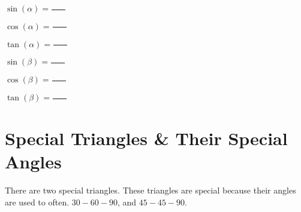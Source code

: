 \documentclass[12pt]{article}
\begin{document}
\vspace{1cm}

\begin{multicols}{2}

	$\sin(\alpha) = \frac{\hspace{1cm}}{ }$\\

		\vspace{.6cm}
	
	$\cos(\alpha) = \frac{\hspace{1cm}}{ }$\\

		\vspace{.6cm}
	
	$\tan(\alpha) = \frac{\hspace{1cm}}{ }$\\
	
		\vspace{.6cm}	
	
	$\sin(\beta) = \frac{\hspace{1cm}}{ }$\\

		\vspace{.6cm}
	
	$\cos(\beta) = \frac{\hspace{1cm}}{ }$\\

		\vspace{.6cm}
	
	$\tan(\beta) = \frac{\hspace{1cm}}{ }$\\
			
\end{multicols}





\section*{Special Triangles \& Their Special Angles}

There are two special triangles. These triangles are special because their angles are used to often. $30-60-90$, and $45-45-90$.\\
\end{document}
